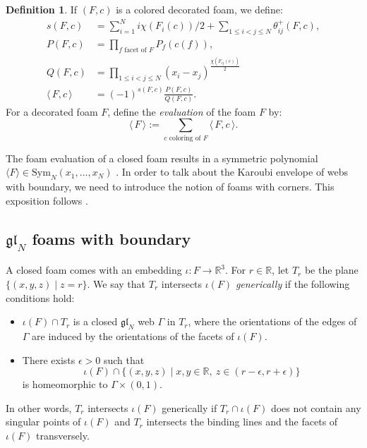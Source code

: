 \documentclass[12pt]{amsart}
\theoremstyle{definition}
\newtheorem{definition}[theorem]{Definition}
\theoremstyle{remark}
\numberwithin{equation}{section}
\numberwithin{figure}{section}
\newcommand{\GL}{\mathfrak{gl}}
\newcommand{\R}{\mathbb{R}}
\begin{document}
\begin{definition}
  If $(F,c)$ is a colored decorated foam, we define:
    \begin{align*}
      s(F,c) &= \sum_{i=1}^N {i\chi(F_i(c))/2}  + \sum_{1\leq i < j \leq N} \theta^+_{ij}(F,c), \\
      P(F,c) &= \prod_{f \textrm{ facet of $F$}} P_f(c(f)),\\%
      Q(F,c) &= \prod_{1\leq i < j \leq N} (x_i-x_j)^{\frac{\chi(F_{ij}(c))}{2}} \\
      \langle\,F,c\,\rangle &= (-1)^{s(F,c)} \frac{P(F,c)}{Q(F,c)}.
    \end{align*}
    For a decorated foam $F$, define the \emph{evaluation} of the foam $F$ by:
    \[ \langle\,F\,\rangle := \sum_{c \textrm{ coloring of $F$}} \langle\,F,c\,\rangle. \]
\end{definition}

The foam evaluation of a closed foam results in a symmetric polynomial $\langle F \rangle \in \mathrm{Sym}_N (x_1, \ldots, x_N)$ \cite[Proposition 2.18]{RW2020}. In order to talk about the Karoubi envelope of webs with boundary, we need to introduce the notion of foams with corners. This exposition follows \cite[Section 2.4]{grlj20266valentvertexmathfrakglnweb}.


\subsection{\texorpdfstring{$\GL_N$}{GL\_N} foams with boundary}
\label{foam with boundary}

A closed foam comes with an embedding $\iota : F \longrightarrow
\mathbb{R}^3$. For $r \in \R$, let $T_r$ be the plane
$\{(x,y,z)\mid z=r\}$. We say that $T_r$ intersects $\iota(F)$
\emph{generically} if the following conditions hold:
\begin{itemize}
    \item $\iota(F) \cap T_r$ is a closed $\GL_N$ web $\Gamma$ in
    $T_r$, where the orientations of the edges of $\Gamma$ are induced by
    the orientations of the facets of $\iota(F)$.
    \item There exists $\epsilon>0$ such that
    \[
    \iota(F) \cap \{(x,y,z)\mid x,y\in \mathbb{R},\
      z \in (r-\epsilon,r+\epsilon)\}
    \]
    is homeomorphic to $\Gamma\times(0,1)$.
\end{itemize}

In other words, $T_r$ intersects $\iota(F)$ generically if
$T_r\cap \iota(F)$ does not contain any singular points of $\iota(F)$ and
$T_r$ intersects the binding lines and the facets of $\iota(F)$
transversely.
\end{document}
